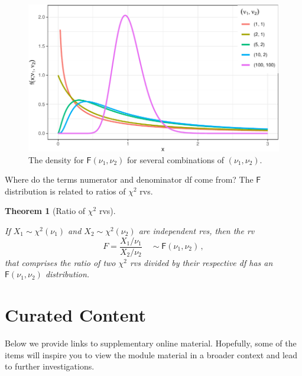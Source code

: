 \documentclass[
  a4paper,
  oneside]{book}
\theoremstyle{definition}
\theoremstyle{definition}
\theoremstyle{definition}
\theoremstyle{plain}
\newtheorem{theorem}{Theorem}[chapter]
\theoremstyle{remark}
\begin{document}
\begin{figure}[H]

{\centering \includegraphics{01-sampling-distributions_files/figure-pdf/exemplar-F-dist-1.pdf}

}

\caption{The density for \(\mathsf{F}(\nu_1, \nu_2)\) for several
combinations of \((\nu_1, \nu_2)\).}

\end{figure}%

Where do the terms numerator and denominator df come from? The
\(\mathsf{F}\) distribution is related to ratios of \(\chi^2\) rvs.

\begin{theorem}[Ratio of \(\chi^2\)
rvs]\protect\hypertarget{thm-F-dist-chidq}{}\label{thm-F-dist-chidq}

If \(X_1 \sim \chi^2(\nu_1)\) and \(X_2 \sim \chi^2(\nu_2)\) are
independent rvs, then the rv \[
 F = \frac{X_1 / \nu_1}{X_2 / \nu_2} \quad \sim \mathsf{F}(\nu_1,\nu_2)\,,
\] that comprises the ratio of two \(\chi^2\) rvs divided by their
respective df has an \(\mathsf{F}(\nu_1, \nu_2)\) distribution.

\end{theorem}

\cleardoublepage
{}
{}
\appendix

\chapter*{Curated Content}\label{curated-content}


Below we provide links to supplementary online material. Hopefully, some
of the items will inspire you to view the module material in a broader
context and lead to further investigations.
\end{document}
